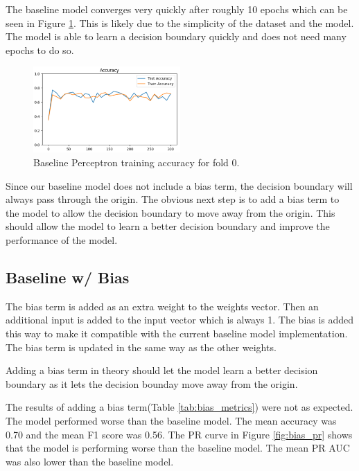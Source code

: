 The baseline model converges very quickly after roughly 10 epochs which can be seen in Figure \ref{fig:baseline_train_acc}. This is likely due to the simplicity of the dataset and the model. The model is able to learn a decision boundary quickly and does not need many epochs to do so. 

\begin{figure}[ht!]
    \centering
    \includegraphics[width=0.5\textwidth]{images/baseline_train_acc.png}
    \caption{Baseline Perceptron training accuracy for fold 0.}
    \label{fig:baseline_train_acc}
\end{figure}

Since our baseline model does not include a bias term, the decision boundary will always pass through the origin. The obvious next step is to add a bias term to the model to allow the decision boundary to move away from the origin. This should allow the model to learn a better decision boundary and improve the performance of the model.

\subsection{Baseline w/ Bias}

The bias term is added as an extra weight to the weights vector. Then an additional input is added to the input vector which is always 1. The bias is added this way to make it compatible with the current baseline model implementation. The bias term is updated in the same way as the other weights.

Adding a bias term in theory should let the model learn a better decision boundary as it lets the decision bounday move away from the origin.

The results of adding a bias term(Table \ref{tab:bias_metrics}) were not as expected. The model performed worse than the baseline model. The mean accuracy was 0.70 and the mean F1 score was 0.56. The PR curve in Figure \ref{fig:bias_pr} shows that the model is performing worse than the baseline model. The mean PR AUC was also lower than the baseline model.

